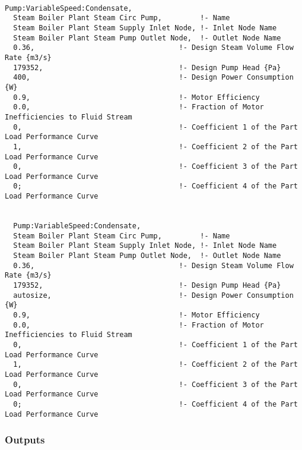 \begin{lstlisting}

Pump:VariableSpeed:Condensate,
  Steam Boiler Plant Steam Circ Pump,         !- Name
  Steam Boiler Plant Steam Supply Inlet Node, !- Inlet Node Name
  Steam Boiler Plant Steam Pump Outlet Node,  !- Outlet Node Name
  0.36,                                  !- Design Steam Volume Flow Rate {m3/s}
  179352,                                !- Design Pump Head {Pa}
  400,                                   !- Design Power Consumption {W}
  0.9,                                   !- Motor Efficiency
  0.0,                                   !- Fraction of Motor Inefficiencies to Fluid Stream
  0,                                     !- Coefficient 1 of the Part Load Performance Curve
  1,                                     !- Coefficient 2 of the Part Load Performance Curve
  0,                                     !- Coefficient 3 of the Part Load Performance Curve
  0;                                     !- Coefficient 4 of the Part Load Performance Curve


  Pump:VariableSpeed:Condensate,
  Steam Boiler Plant Steam Circ Pump,         !- Name
  Steam Boiler Plant Steam Supply Inlet Node, !- Inlet Node Name
  Steam Boiler Plant Steam Pump Outlet Node,  !- Outlet Node Name
  0.36,                                  !- Design Steam Volume Flow Rate {m3/s}
  179352,                                !- Design Pump Head {Pa}
  autosize,                              !- Design Power Consumption {W}
  0.9,                                   !- Motor Efficiency
  0.0,                                   !- Fraction of Motor Inefficiencies to Fluid Stream
  0,                                     !- Coefficient 1 of the Part Load Performance Curve
  1,                                     !- Coefficient 2 of the Part Load Performance Curve
  0,                                     !- Coefficient 3 of the Part Load Performance Curve
  0;                                     !- Coefficient 4 of the Part Load Performance Curve
\end{lstlisting}

\subsubsection{Outputs}\label{outputs-2-016}

